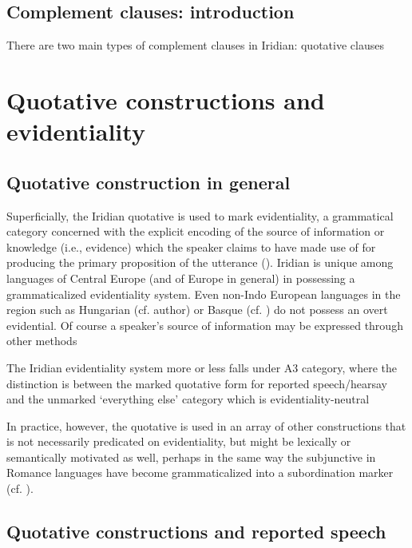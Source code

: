 \subsection{Complement clauses: introduction}\label{sec:complement-clauses}

There are two main types of complement clauses in Iridian: quotative clauses 


\section{Quotative constructions and  evidentiality}\label{sec:reportedspeech}

\subsection{Quotative construction in general}

Superficially, the Iridian quotative is used to mark {\sc evidentiality}, a
grammatical category concerned with the explicit encoding of the source of
information or knowledge (i.e., evidence) which the speaker claims to have made
use of for producing the primary proposition of the utterance
(\cite[1-2]{diewald2010}). Iridian is unique among languages of Central Europe
(and of Europe in general) in possessing a grammaticalized evidentiality system.
Even non-Indo European languages in the region such as Hungarian (cf. author) or
Basque (cf. \cite{alcazar2010}) do not possess an overt evidential. Of course a
speaker’s source of information may be expressed through other methods 

The Iridian evidentiality system more or less falls under
 A3 category, where the distinction is between the
marked quotative form for reported speech/hearsay and the unmarked ‘everything
else’ category which is evidentiality-neutral

In practice, however, the quotative is used in an array of other constructions
that is not necessarily predicated on evidentiality, but might be lexically or
semantically motivated as well, perhaps in the same way the subjunctive in
Romance languages have become grammaticalized into a subordination marker (cf.
\cite{poplacketal}).

\subsection{Quotative constructions and reported
speech}\label{sec:quotative-const}

